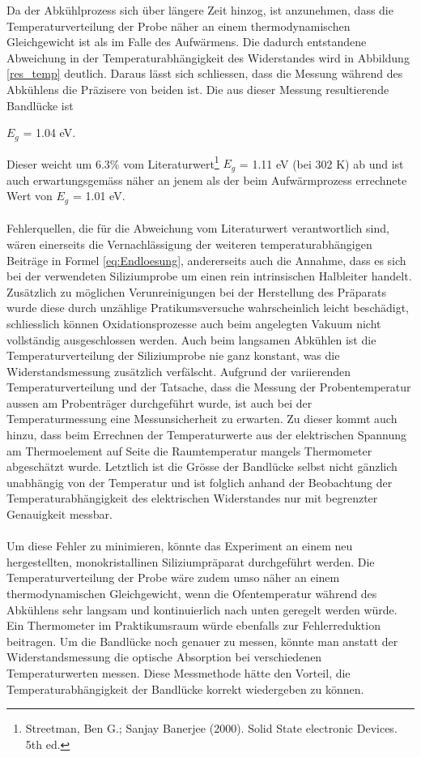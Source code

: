 \documentclass[a4paper,parskip,11pt, DIV12]{scrreprt}
\begin{document}
Da der Abkühlprozess sich über längere Zeit hinzog, ist anzunehmen, dass die Temperaturverteilung der Probe näher an einem thermodynamischen Gleichgewicht ist als im Falle des Aufwärmens. Die dadurch entstandene Abweichung in der Temperaturabhängigkeit des Widerstandes wird in Abbildung
\ref{res_temp} deutlich. Daraus lässt sich schliessen, dass die Messung während des Abkühlens die Präzisere von beiden ist. Die aus dieser Messung resultierende Bandlücke ist \begin{center}
$E_g$ = 1.04 eV.
\end{center} Dieser weicht um 6.3\% vom Literaturwert\footnote{Streetman, Ben G.; Sanjay Banerjee (2000). Solid State electronic Devices. 5th ed.} $E_g$ = 1.11 eV (bei 302 K) ab und ist auch erwartungsgemäss näher an jenem als der beim Aufwärmprozess errechnete Wert von $E_g$ = 1.01 eV. \\
\\
Fehlerquellen, die für die Abweichung vom Literaturwert verantwortlich sind, wären einerseits die Vernachlässigung der weiteren temperaturabhängigen Beiträge in Formel \ref{eq:Endloesung}, andererseits auch die Annahme, dass es sich bei der verwendeten Siliziumprobe um einen rein intrinsischen Halbleiter handelt. Zusätzlich zu möglichen Verunreinigungen bei der Herstellung des Präparats wurde diese durch unzählige Pratikumsversuche wahrscheinlich leicht beschädigt, schliesslich können Oxidationsprozesse auch beim angelegten Vakuum nicht vollständig ausgeschlossen werden. Auch beim langsamen Abkühlen ist die Temperaturverteilung der Siliziumprobe nie ganz konstant, was die Widerstandsmessung zusätzlich verfälscht. Aufgrund der variierenden Temperaturverteilung und der Tatsache, dass die Messung der Probentemperatur aussen am Probenträger durchgeführt wurde, ist auch bei der Temperaturmessung eine Messunsicherheit zu erwarten. Zu dieser kommt auch hinzu, dass beim Errechnen der Temperaturwerte aus der elektrischen Spannung am Thermoelement auf Seite \pageref{Kacktabelle} die Raumtemperatur mangels Thermometer abgeschätzt wurde. Letztlich ist die Grösse der Bandlücke selbst nicht gänzlich unabhängig von der Temperatur und ist folglich anhand der Beobachtung der Temperaturabhängigkeit des elektrischen Widerstandes nur mit begrenzter Genauigkeit messbar. \\
\\
Um diese Fehler zu minimieren, könnte das Experiment an einem neu hergestellten, monokristallinen Siliziumpräparat durchgeführt werden. Die Temperaturverteilung der Probe wäre zudem umso näher an einem thermodynamischen Gleichgewicht, wenn die Ofentemperatur während des Abkühlens sehr langsam und kontinuierlich nach unten geregelt werden würde. Ein Thermometer im Praktikumsraum würde ebenfalls zur Fehlerreduktion beitragen. Um die Bandlücke noch genauer zu messen, könnte man anstatt der Widerstandsmessung die optische Absorption bei verschiedenen Temperaturwerten messen. Diese Messmethode hätte den Vorteil, die Temperaturabhängigkeit der Bandlücke korrekt wiedergeben zu können.
\end{document}
